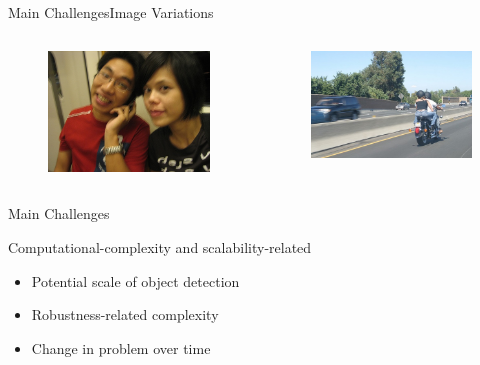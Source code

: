 \begin{frame}{Main Challenges}{Image Variations}
\begin{columns}
        \begin{figure}
            \includegraphics[width=0.7 \textwidth]{figs/000323.jpg}
        \end{figure}
        \begin{figure}
            \includegraphics[width=0.7 \textwidth]{figs/000579.jpg}
        \end{figure}

    \end{columns}
\end{frame}

\begin{frame}{Main Challenges}{}
        \begin{block}{Computational-complexity and scalability-related}
        \begin{itemize}
            \item Potential scale of object detection
            \item Robustness-related complexity
            \item Change in problem over time
        \end{itemize}
            

        \end{block}
\end{frame}

